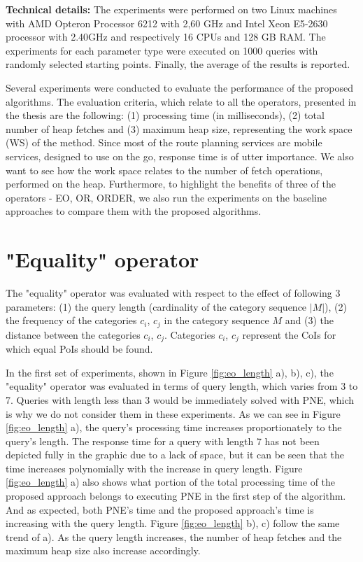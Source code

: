 \textbf{Technical details:}
The experiments were performed on two Linux machines with AMD Opteron Processor 6212 with 2,60 GHz and Intel Xeon E5-2630 processor with 2.40GHz and respectively 16 CPUs and 128 GB RAM. The experiments for each parameter type were executed on 1000 queries with randomly selected starting points. Finally, the average of the results is reported.

Several experiments were conducted to evaluate the performance of the proposed algorithms. The evaluation criteria, which relate to all the operators, presented in the thesis are the following: (1) processing time (in milliseconds), (2) total number of heap fetches and (3) maximum heap size, representing the work space (WS) of the method. Since most of the route planning services are mobile services, designed to use on the go, response time is of utter importance. We also want to see how the work space relates to the number of fetch operations, performed on the heap. Furthermore, to highlight the benefits of three of the operators - EO, OR, ORDER, we also run the experiments on the baseline approaches to compare them with the proposed algorithms. 

\section{"Equality" operator}
\label{sec:experimentsEO}

The "equality" operator was evaluated with respect to the effect of following 3 parameters: (1) the query length (cardinality of the category sequence $|M|$), (2) the frequency of the categories $c_i$, $c_j$ in the category sequence $M$ and (3) the distance between the categories $c_i$, $c_j$. Categories $c_i$, $c_j$ represent the CoIs for which equal PoIs should be found.

In the first set of experiments, shown in Figure \ref{fig:eo_length} a), b), c), the "equality" operator was evaluated in terms of query length, which varies from 3 to 7. Queries with length less than 3 would be immediately solved with PNE, which is why we do not consider them in these experiments. 
As we can see in Figure \ref{fig:eo_length} a), the query's processing time increases proportionately to the query's length. The response time for a query with length 7 has not been depicted fully in the graphic due to a lack of space, but it can be seen that the time increases polynomially with the increase in query length. Figure \ref{fig:eo_length} a) also shows what portion of the total processing time of the proposed approach belongs to executing PNE in the first step of the algorithm. And as expected, both PNE's time and the proposed approach's time is increasing with the query length.
Figure \ref{fig:eo_length} b), c) follow the same trend of a). As the query length increases, the number of heap fetches and the maximum heap size also increase accordingly.

